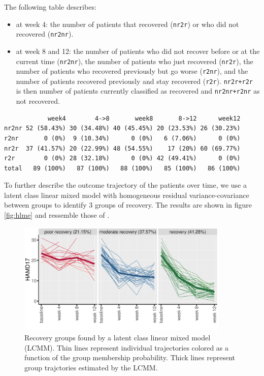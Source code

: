 \documentclass[12pt]{article}
\begin{document}
The following table describes:
\begin{itemize}
\item at week 4: the number of patients that recovered (\texttt{nr2r}) or who did
not recovered (\texttt{nr2nr}).
\item at week 8 and 12: the number of patients who did not recover before
or at the current time (\texttt{nr2nr}), the number of patients who just
recovered (\texttt{nr2r}), the number of patients who recovered previously
but go worse (\texttt{r2nr}), and the number of patients recovered
previously and stay recovered (\texttt{r2r}). \texttt{nr2r+r2r} is then number of
patients currently classified as recovered and \texttt{nr2nr+r2nr} as not
recovered.
\end{itemize}
\begin{verbatim}
            week4        4->8       week8       8->12      week12
nr2nr 52 (58.43%) 30 (34.48%) 40 (45.45%) 20 (23.53%) 26 (30.23%)
r2nr       0 (0%)  9 (10.34%)      0 (0%)   6 (7.06%)      0 (0%)
nr2r  37 (41.57%) 20 (22.99%) 48 (54.55%)    17 (20%) 60 (69.77%)
r2r        0 (0%) 28 (32.18%)      0 (0%) 42 (49.41%)      0 (0%)
total   89 (100%)   87 (100%)   88 (100%)   85 (100%)   86 (100%)
\end{verbatim}


To further describe the outcome trajectory of the patients over time,
we use a latent class linear mixed model with homogeneous residual
variance-covariance between groups to identify 3 groups of
recovery. The results are shown in figure \autoref{fig:hlme} and
ressemble those of \cite{goerigk2021distinct}.

\begin{figure}[!h]
\centering
\includegraphics[trim={0 0 0 0},width=0.9\textwidth]{./../figures/spaghetti-HAMD17.pdf}
\caption{\label{fig:hlme}Recovery groups found by a latent class linear mixed model (LCMM). Thin lines represent individual trajectories colored as a function of the group membership probability. Thick lines represent group trajctories estimated by the LCMM.}
\end{figure}
\end{document}
